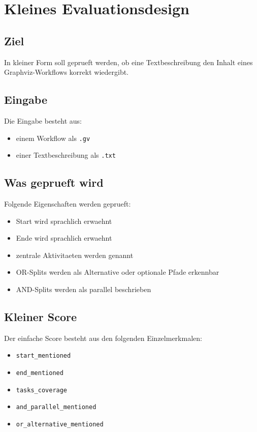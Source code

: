 \section{Kleines Evaluationsdesign}

\subsection{Ziel}

In kleiner Form soll geprueft werden, ob eine Textbeschreibung den Inhalt eines Graphviz-Workflows korrekt wiedergibt.

\subsection{Eingabe}

Die Eingabe besteht aus:

\begin{itemize}
  \item einem Workflow als \texttt{.gv}
  \item einer Textbeschreibung als \texttt{.txt}
\end{itemize}

\subsection{Was geprueft wird}

Folgende Eigenschaften werden geprueft:

\begin{itemize}
  \item Start wird sprachlich erwaehnt
  \item Ende wird sprachlich erwaehnt
  \item zentrale Aktivitaeten werden genannt
  \item OR-Splits werden als Alternative oder optionale Pfade erkennbar
  \item AND-Splits werden als parallel beschrieben
\end{itemize}

\subsection{Kleiner Score}

Der einfache Score besteht aus den folgenden Einzelmerkmalen:

\begin{itemize}
  \item \texttt{start\_mentioned}
  \item \texttt{end\_mentioned}
  \item \texttt{tasks\_coverage}
  \item \texttt{and\_parallel\_mentioned}
  \item \texttt{or\_alternative\_mentioned}
\end{itemize}

